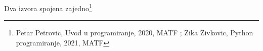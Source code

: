 \documentclass{article}
\begin{document}
Dva izvora spojena zajedno\footnote{Petar Petrovic, Uvod u programiranje, 2020, MATF ; Zika Zivkovic, Python programiranje, 2021, MATF}
\end{document}
